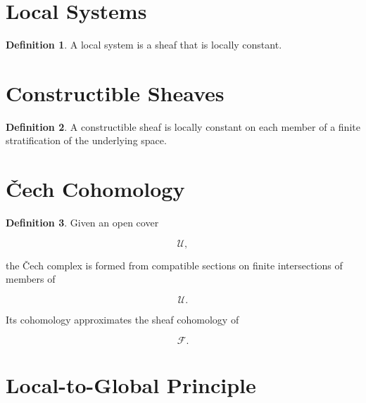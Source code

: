 \documentclass[11pt]{book}
\numberwithin{equation}{chapter}
\theoremstyle{definition}
\newtheorem{definition}{Definition}[chapter]
\theoremstyle{plain}
\begin{document}

\section{Local Systems}

\begin{definition}

A local system is a sheaf that is locally constant.

\end{definition}


\section{Constructible Sheaves}

\begin{definition}

A constructible sheaf is locally constant on each member of a finite
stratification of the underlying space.

\end{definition}


\section{Čech Cohomology}

\begin{definition}

Given an open cover

\[
\mathcal U,
\]

the Čech complex is formed from compatible sections on finite
intersections of members of

\[
\mathcal U.
\]

Its cohomology approximates the sheaf cohomology of

\[
\mathcal F.
\]

\end{definition}


\section{Local-to-Global Principle}
\end{document}
